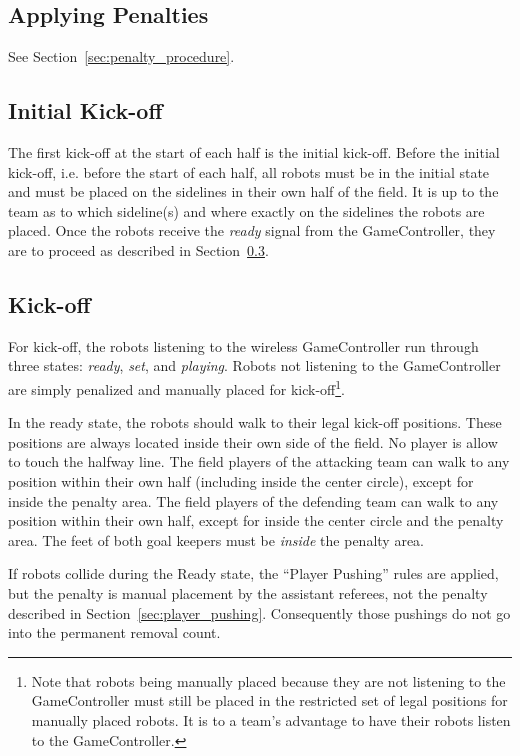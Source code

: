 \documentclass[12pt]{article}
\begin{document}
\subsection{Applying Penalties}

See Section~\ref{sec:penalty_procedure}.


\subsection{Initial Kick-off}
\label{sec:initial-kick-off}

The first kick-off at the start of each half is the initial kick-off.
Before the initial kick-off, i.e. before the start of each half, all robots must be in the initial state and must be placed on the sidelines in their own half of the field.
It is up to the team as to which sideline(s) and where exactly on the sidelines the robots are placed.
Once the robots receive the \emph{ready} signal from the GameController, they are to proceed as described in Section~\ref{sec:kick-off}.


\subsection{Kick-off}
\label{sec:kick-off}
For kick-off, the robots listening to the wireless GameController run through three states: \emph{ready}, \emph{set}, and \emph{playing}. Robots not listening to the GameController are simply penalized and manually placed for kick-off\footnote{Note that robots being manually placed because they are not listening to the GameController must still be placed in the restricted set of legal positions for manually placed robots. It is to a team's advantage to have their robots listen to the GameController.}.

In the ready state, the robots should walk to their legal kick-off positions. These positions are always located inside their own side of the field. No player is allow to touch the halfway line.
The field players of the attacking team can walk to any position within their own half (including inside the center circle), except for inside the penalty area.
The field players of the defending team can walk to any position within their own half, except for inside the center circle and the penalty area.
The feet of both goal keepers must be \emph{inside} the penalty area.

If robots collide during the Ready state, the ``Player Pushing'' rules are applied, but the penalty is manual placement by the assistant referees, not the penalty described in Section~\ref{sec:player_pushing}.
Consequently those pushings do not go into the permanent removal count.
\end{document}
